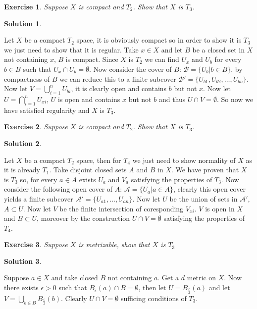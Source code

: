 \documentclass[11pt,a4paper]{article}
\newtheorem{Ex}{Exercise}
\newtheorem{Sol}{Solution}
\begin{document}
\begin{Ex}
	Suppose $X$ is compact and $T_2$. Show that $X$ is $T_3$.
\end{Ex} 
\begin{Sol}\end{Sol}
\noindent	Let $X$ be a compact $T_2$ space, it is obviously compact so in order to show it is $T_3$ we just need to show that it is regular. Take $x \in X$ and let $B$ be a closed set in $X$ not containing $x$, $B$ is compact. Since $X$ is $T_2$ we can find $U_x$ and $U_b$ for every $b \in B$ such that $U_x \cap U_b = \emptyset$. Now consider the cover of $B$: $\mathcal{B}=\{U_b|b\in B \}$, by compactness of $B$ we can reduce this to a finite subcover $\mathcal{B}' = \{U_{b1},U_{b2}, \dots, U_{bn} \}$. Now let $V = \bigcup_{i=1}^n U_{bi}$, it is clearly open and contains $b$ but not $x$. Now let $U = \bigcap_{i=1}^n U_{xi}$, $U$ is open and contains $x$ but not $b$ and thus $U \cap V = \emptyset$. So now we have satisfied regularity and $X$ is $T_3$.
	
\begin{Ex}
	Suppose $X$ is compact and $T_2$. Show that $X$ is $T_3$.
\end{Ex}

\begin{Sol}\end{Sol}
\noindent Let $X$ be a compact $T_2$ space, then for $T_4$ we just need to show normality of $X$ as it is already $T_1$. Take disjoint closed sets $A$ and $B$ in $X$. We have proven that $X$ is $T_3$ so, for every $a \in A$ exists $U_a$ and $V_a$ satisfying the properties of $T_3$. Now consider the following open cover of $A$: $\mathcal{A} = \{U_a | a \in A\}$, clearly this open cover yields a finite subcover $\mathcal{A}' = \{U_{a1},\dots,U_{an} \}$. Now let $U$ be the union of sets in $\mathcal{A}'$, $A \subset U$. Now let $V$ be the finite intersection of coresponding $V_{xi}$. $V$ is open in $X$ and $B \subset U$, moreover by the construction $U \cap V =\emptyset$ satisfying the properties of $T_4$.

\begin{Ex}
	Suppose $X$ is metrizable, show that $X$ is $T_3$
\end{Ex}
\begin{Sol}\end{Sol}
\noindent Suppose $a \in X$ and take closed $B$ not containing $a$. Get a $d$ metric on $X$. Now there exists $\epsilon > 0$ such that $B_\epsilon(a) \cap B = \emptyset$, then  let $ U= B_{\frac{\epsilon}{2}}(a)$ and let $V= \bigcup_{b\in B} B_{\frac{\epsilon}{2}}(b)$. Clearly $U\cap V = \emptyset$ sufficing conditions of $T_3$.
\end{document}
